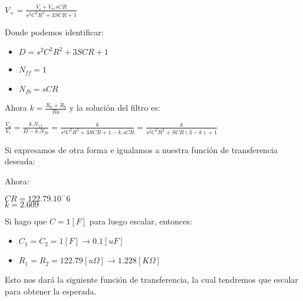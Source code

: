     \begin{center}
        $V_+ = \frac{V_i + V_o.sCR}{s^2C^2R^2+3SCR + 1}$
    \end{center}

    Donde podemos identificar:\\
    
    \begin{itemize}
        \item $D = s^2C^2R^2+3SCR + 1$
        \item $N_{ff} = 1$
        \item $N_{fb} = sCR$
    \end{itemize}

    Ahora $k = \frac{R_a + R_b}{Ra}$ y la solución del filtro es:\\

    \begin{center}
        \large{$\frac{V_o}{V_i} = \frac{k.N_{ff}}{D-k.N_{fb}} = \frac{k}{s^2C^2R^2+3SCR + 1-k.sCR} = \frac{k}{s^2C^2R^2+SCR(3-k) + 1}$}
    \end{center}

    Si expresamos de otra forma e igualamos a nuestra función de transferencia deseada:\\

    \begin{center}
    \end{center}

    Ahora:\\
    
    \begin{center}
        $CR = 122.79.10^-6$\\
        $k = 2.609$\\
    \end{center}

    Si hago que $C=1[F]$ para luego escalar, entonces:\\

    \begin{itemize}
        \item $C_1 = C_2 = 1 [F] \xrightarrow{} 0.1 [uF]$
        \item $R_1 = R_2 = 122.79 [u\Omega] \xrightarrow{} 1.228 [K\Omega]$
    \end{itemize}

    Esto nos dará la siguiente función de transferencia, la cual tendremos que escalar para obtener la esperada.\\


